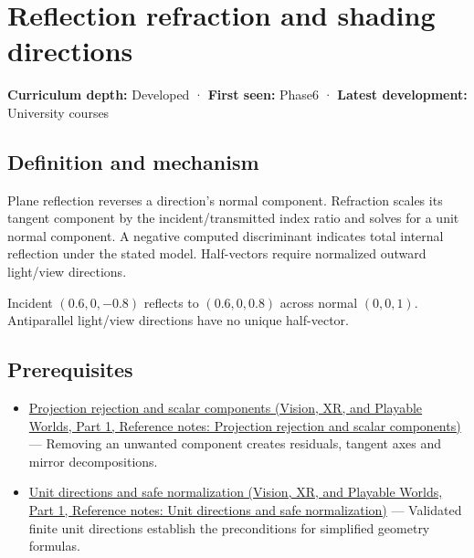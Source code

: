\hypertarget{appendix-44e00863b4d5}{}\label{referencestart:appendix-44e00863b4d5}
\section{Reflection refraction and shading directions}\label{appendix-44e00863b4d5-reflection-refraction-and-shading-directions}

\hypertarget{appendix-44e00863b4d5-reflection-refraction-and-shading-directions}{}

\textbf{Curriculum depth:} Developed · \textbf{First seen:} Phase6 · \textbf{Latest development:} University courses

\begin{allmightroledefinition}

\subsection{Definition and mechanism}\label{appendix-44e00863b4d5-definition-and-mechanism}

\hypertarget{appendix-44e00863b4d5-definition-and-mechanism}{}

Plane reflection reverses a direction's normal component. Refraction scales its tangent component by the incident/transmitted index ratio and solves for a unit normal component. A negative computed discriminant indicates total internal reflection under the stated model. Half-vectors require normalized outward light/view directions.

\end{allmightroledefinition}

Incident \((0.6,0,-0.8)\) reflects to \((0.6,0,0.8)\) across normal \((0,0,1)\). Antiparallel light/view directions have no unique half-vector.

\subsection{Prerequisites}\label{appendix-44e00863b4d5-prerequisites}

\hypertarget{appendix-44e00863b4d5-prerequisites}{}

\begin{itemize}
\tightlist
\item
  \href{../07-Vision-XR-and-Playable-Worlds-P01/main.pdf\#nameddest=appendix-505a502c372a}{Projection rejection and scalar components (Vision, XR, and Playable Worlds, Part 1, Reference notes: Projection rejection and scalar components)} --- Removing an unwanted component creates residuals, tangent axes and mirror decompositions.
\item
  \href{../07-Vision-XR-and-Playable-Worlds-P01/main.pdf\#nameddest=appendix-f744e41b95b4}{Unit directions and safe normalization (Vision, XR, and Playable Worlds, Part 1, Reference notes: Unit directions and safe normalization)} --- Validated finite unit directions establish the preconditions for simplified geometry formulas.
\end{itemize}

